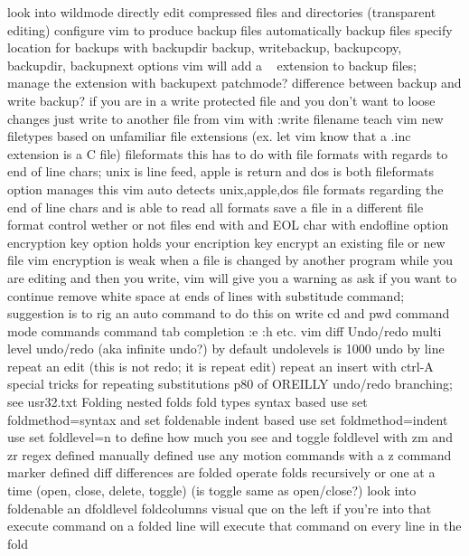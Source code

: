 \documentclass[12pt]{book}
\begin{document}
{{        look into wildmode
    directly edit compressed files and directories (transparent editing)
    configure vim to produce backup files
      automatically backup files
      specify location for backups with backupdir
      backup, writebackup, backupcopy, backupdir, backupnext options
      vim will add a ~ extension to backup files; manage the extension with backupext
      patchmode?
      difference between backup and write backup?
      if you are in a write protected file and you don't want to loose changes just write to another file from vim with :write filename
    teach vim new filetypes based on unfamiliar file extensions (ex. let vim know that a .inc extension is a C file)
    fileformats
      this has to do with file formats with regards to end of line chars; unix is line feed, apple is return and dos is both
      fileformats option manages this
      vim auto detects unix,apple,dos file formats regarding the end of line chars and is able to read all formats
      save a file in a different file format
    control wether or not files end with and EOL char with endofline option
    encryption
      key option holds your encription key
      encrypt an existing file or new file
      vim encryption is weak
    when a file is changed by another program while you are editing and then you write, vim will give you a warning as ask if you want to continue
    remove white space at ends of lines with substitude command; suggestion is to rig an auto command to do this on write
    cd and pwd command mode commands
  command tab completion :e :h etc.
  vim diff
  Undo/redo
    multi level undo/redo (aka infinite undo?)
      by default undolevels is 1000
    undo by line
    repeat an edit (this is not redo; it is repeat edit)
    repeat an insert with ctrl-A
    special tricks for repeating substitutions p80 of OREILLY
    undo/redo branching; see usr32.txt
  Folding
    nested folds
    fold types
      syntax based
        use set foldmethod=syntax and set foldenable
      indent based
        use set foldmethod=indent
        use set foldlevel=n to define how much you see and toggle foldlevel with zm and zr
      regex defined
      manually defined
        use any motion commands with a z command
      marker defined
      diff differences are folded
    operate folds recursively or one at a time (open, close, delete, toggle) (is toggle same as open/close?)
    look into foldenable an dfoldlevel
    foldcolumns visual que on the left if you're into that
    execute command on a folded line will execute that command on every line in the fold
}}
\end{document}
